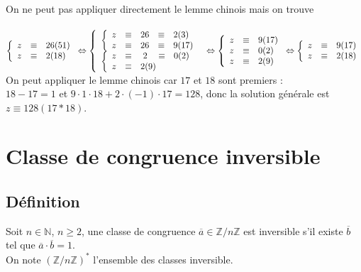 \documentclass[a4paper,10pt]{book} %
\newcommand{\N}{\mathbb{N}}
\newcommand{\Z}{\mathbb{Z}}
\begin{document}
\begin{enumerate}
On ne peut pas appliquer directement le lemme chinois mais on trouve\\\\
$\left\{\begin{array}{rcl}
z&\equiv &26(51) \\  z&\equiv &2 (18)
\end{array}\right.\Leftrightarrow \left\{\begin{array}{l} \left\{\begin{array}{rcccl}
z&\equiv &26&\equiv &2(3) \\ z&\equiv &26&\equiv &9 (17)
\end{array}\right. \\ \left\{\begin{array}{rcl}
z&\equiv &\hspace*{0.1cm}2\hspace*{0.35cm}\equiv \hspace*{0.25cm}0(2) \\ z&\equiv& 2 (9)
\end{array}\right. \end{array}\right.\Leftrightarrow \left\{\begin{array}{rcl}
z&\equiv &9(17) \\ z&\equiv &0 (2)\\z&\equiv &2(9)
\end{array}\right.\Leftrightarrow \left\{\begin{array}{rcl}
z&\equiv &9(17) \\ z&\equiv &2 (18)
\end{array}\right.$\\

On peut appliquer le lemme chinois car $17$ et $18$ sont premiers :\\
$18-17=1$ et $9\cdot 1\cdot 18+2\cdot (-1)\cdot 17=128$, donc la solution générale est $z\equiv 128(17*18)$.
\end{enumerate}

\newpage

\section{Classe de congruence inversible}
\subsection{Définition}
Soit $n\in \N$, $n\geq 2$, une classe de congruence $\overline{a} \in\Z/n\Z$ est inversible s'il existe $\overline{b}$ tel que $\overline{a}\cdot \overline{b}=1$.\\
On note $(\Z/n\Z)^*$ l'ensemble des classes inversible.
\end{document}
